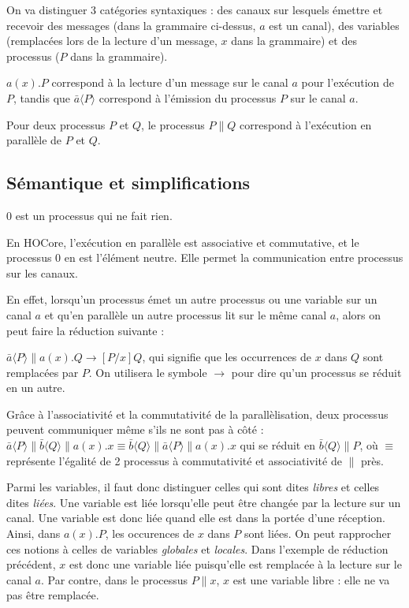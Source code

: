 \documentclass[11pt]{article}
\begin{document}
On va distinguer 3 catégories syntaxiques : des canaux sur lesquels émettre et recevoir des messages (dans la grammaire ci-dessus, $a$ est un canal), des variables (remplacées lors de la lecture d'un message, $x$ dans la grammaire) et des processus ($P$ dans la grammaire).

$a(x).P$ correspond à la lecture d'un message sur le canal $a$ pour l'exécution de $P$, tandis que $\bar{a}\langle P\rangle$ correspond à l'émission du processus $P$ sur le canal $a$.

Pour deux processus $P$ et $Q$, le processus $P\|Q$ correspond à l'exécution en parallèle de $P$ et $Q$.


\subsection{Sémantique et simplifications}
$0$ est un processus qui ne fait rien.

En HOCore, l'exécution en parallèle est associative et commutative, et le processus $0$ en est l'élément neutre. Elle permet la communication entre processus sur les canaux.

En effet, lorsqu'un processus émet un autre processus ou une variable sur un canal $a$ et qu'en parallèle un autre processus lit sur le même canal $a$, alors on peut faire la réduction suivante :

$\bar{a}\langle P\rangle\|a(x).Q \rightarrow [P/x]Q$, qui signifie que les occurrences de $x$ dans $Q$ sont remplacées par $P$. On utilisera le symbole $\rightarrow$ pour dire qu'un processus se réduit en un autre.

Grâce à l'associativité et la commutativité de la parallèlisation, deux processus peuvent communiquer même s'ils ne sont pas à côté : $\bar{a}\langle P\rangle\|\bar{b}\langle Q\rangle\|a(x).x \equiv  \bar{b}\langle Q\rangle\|\bar{a}\langle P\rangle\|a(x).x$ qui se réduit en $\bar{b}\langle Q\rangle\|P$, où $\equiv$ représente l'égalité de 2 processus à commutativité et associativité de $\|$ près.

Parmi les variables, il faut donc distinguer celles qui sont dites \textit{libres} et celles dites \textit{liées}. 
Une variable est liée lorsqu'elle peut être changée par la lecture sur un canal. Une variable est donc liée quand elle est dans la portée d'une réception. Ainsi, dans $a(x).P$, les occurences de $x$ dans $P$ sont liées. On peut rapprocher ces notions à celles de variables \textit{globales} et \textit{locales}.
Dans l'exemple de réduction précédent, $x$ est donc une variable liée puisqu'elle est remplacée à la lecture sur le canal $a$. Par contre, dans le processus $P\|x$, $x$ est une variable libre : elle ne va pas être remplacée. 
\end{document}
